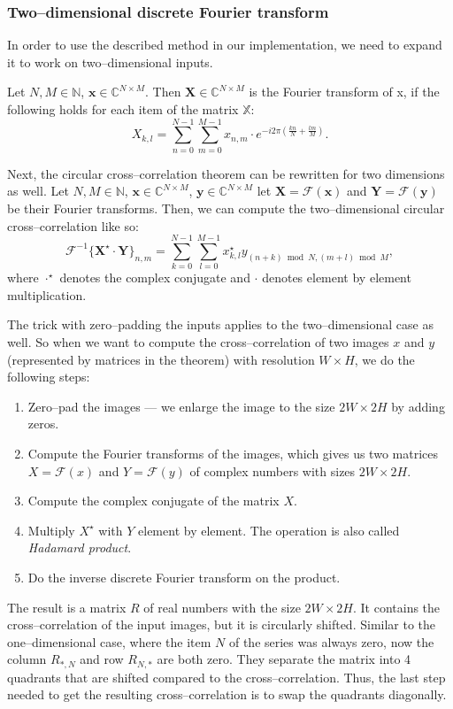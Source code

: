 \subsubsection{Two--dimensional discrete Fourier transform}

In order to use the described method in our implementation, we need to expand it to work on two--dimensional inputs.

Let $N, M \in \mathbb{N}$, $\mathbf{x} \in \mathbb{C}^{N\times M}$. Then $\mathbf{X} \in \mathbb{C}^{N\times M}$ is the Fourier transform of x, if the following holds for each item of the matrix $\mathbb{X}$:
\[
X_{k,l} = \sum_{n=0}^{N-1} \sum_{m=0}^{M-1} x_{n,m} \cdot e^{-i2\pi(\frac{kn}{N} + \frac{lm}{M})}.
\]

Next, the circular cross--correlation theorem can be rewritten for two dimensions as well. Let $N, M \in \mathbb{N}$, $\mathbf{x} \in \mathbb{C}^{N\times M}$, $\mathbf{y} \in \mathbb{C}^{N\times M}$ let $\mathbf{X} = \mathcal{F}(\mathbf{x})$ and $\mathbf{Y} = \mathcal{F}(\mathbf{y})$ be their Fourier transforms. Then, we can compute the two--dimensional circular cross--correlation like so: 
\[
\mathcal{F}^{-1}\{\mathbf{X}^\star \cdot \mathbf{Y}\}_{n,m} = \sum_{k=0}^{N-1} \sum_{l=0}^{M-1} x^\star_{k,l} y_{(n+k)\bmod N, (m+l)\bmod M},
\]
where $\cdot^\star$ denotes the complex conjugate and $\cdot$ denotes element by element multiplication.

The trick with zero--padding the inputs applies to the two--dimensional case as well. So when we want to compute the cross--correlation of two images $x$ and $y$ (represented by matrices in the theorem) with resolution $W \times H$, we do the following steps:
\begin{enumerate}
	\item Zero--pad the images --- we enlarge the image to the size $2W \times 2H$ by adding zeros.
	\item Compute the Fourier transforms of the images, which gives us two matrices $X = \mathcal{F}(x)$ and $Y =\mathcal{F}(y)$ of complex numbers with sizes $2W \times 2H$.
	\item Compute the complex conjugate of the matrix $X$.
	\item Multiply $X^\star$ with $Y$ element by element. The operation is also called \emph{Hadamard product}.
	\item Do the inverse discrete Fourier transform on the product.
\end{enumerate}
The result is a matrix $R$ of real numbers with the size $2W \times 2H$. It contains the cross--correlation of the input images, but it is circularly shifted. Similar to the one--dimensional case, where the item $N$ of the series was always zero, now the column $R_{*,N}$ and row $R_{N,*}$ are both zero. They separate the matrix into 4 quadrants that are shifted compared to the cross--correlation. Thus, the last step needed to get the resulting cross--correlation is to swap the quadrants diagonally.

